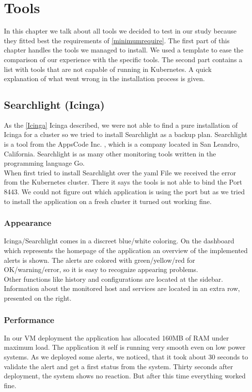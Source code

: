  
\chapter{Tools} 
In this chapter we talk about all tools we decided to test in our study because they fitted best the requirements of \cref{minimumrequire}. The first part of this chapter handles the tools we managed to install. We used a template to ease the comparison of our experience with the specific tools. The second part contains a list with tools that are not capable of running in Kubernetes. A quick explanation of what went wrong in the installation process is given.


\section{Searchlight (Icinga)}
\label{searchlight}
As the \cref{Icinga} Icinga described, we were not able to find a pure installation of Icinga for a cluster so we tried to install Searchlight as a backup plan.
Searchlight is a tool from the AppsCode Inc. \cite{appscode}, which is a company located in San Leandro, California. 
Searchlight is as many other monitoring tools written in the programming language Go.
\\
When first tried to install Searchlight over the yaml File we received the error from the Kubernetes cluster. There it says the tools is not able to bind the Port 8443. We could not figure out which application is using the port but as we tried to install the application on a fresh cluster it turned out working fine.
\subsection{Appearance}
Icinga/Searchlight comes in a  discreet blue/white coloring. On the dashboard which represents the homepage of the application an overview of the implemented alerts is shown. The alerts are colored with green/yellow/red for OK/warning/error, so it is easy to recognize appearing problems.\\
 Other functions like history and configurations are located at the sidebar. Information about the monitored host and services are located in an extra row, presented on the right.
\subsection{Performance}
In our VM deployment the application has allocated 160MB of RAM under maximum load. The application it self is running very smooth even on low power systems. As we deployed some alerts, we noticed, that it took about 30 seconds to validate the alert and get a first status from the system. Thirty seconds after deployment, the system shows no reaction. But after this time everything worked fine.

